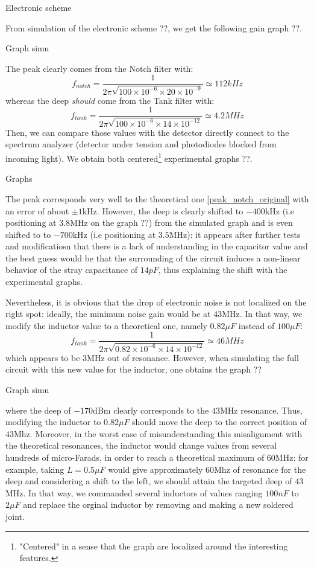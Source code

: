 \documentclass[12pt]{report}
\begin{document}
Electronic scheme

From simulation of the electronic scheme ??, we get the following gain graph ??. 

Graph simu

The peak clearly comes from the Notch filter with:
\begin{equation}
\label{peak_notch_original}
f_{notch} = \frac{1}{2\pi\sqrt{100 \times 10^{-6} \times 20 \times 10^{-9}}} \simeq 112kHz
\end{equation}
whereas the deep \textit{should} come from the Tank filter with:
\begin{equation}
f_{tank} = \frac{1}{2\pi\sqrt{100 \times 10^{-6} \times 14 \times 10^{-12}}} \simeq 4.2MHz
\end{equation}
Then, we can compare those values with the detector directly connect to the spectrum analyzer (detector under tension and photodiodes blocked from incoming light). We obtain both centered\footnote{"Centered" in a sense that the graph are localized around the interesting features.} experimental graphs ??.

Graphs 

The peak corresponds very well to the theoretical one \eqref{peak_notch_original} with an error of about $\pm1$kHz. However, the deep is clearly shifted to $-400$kHz (i.e positioning at $3.8$MHz on the graph ??) from the simulated graph and is even shifted to to $-700$kHz (i.e positioning at $3.5$MHz): it appears after further tests and modificatiosn that there is a lack of understanding in the capacitor value and the best guess would be that the surrounding of the circuit induces a non-linear behavior of the stray capacitance of $14pF$, thus explaining the shift with the experimental graphs.

Nevertheless, it is obvious that the drop of electronic noise is not localized on the right spot: ideally, the minimum noise gain would be at $43$MHz. In that way, we modify the inductor value to a theoretical one, namely $0.82\mu F$ instead of $100\mu F$:
\begin{equation}
f_{tank} = \frac{1}{2\pi\sqrt{0.82 \times 10^{-6} \times 14 \times 10^{-12}}} \simeq 46MHz
\end{equation}
which appears to be $3$MHz out of resonance. However, when simulating the full circuit with this new value for the inductor, one obtains the graph ??

Graph simu

where the deep of $-170$dBm clearly corresponds to the $43$MHz resonance. Thus, modifying the inductor to $0.82\mu F$ should move the deep to the correct position of $43$Mhz. Moreover, in the worst case of misunderstanding this misalignment with the theoretical resonances, the inductor would change values from several hundreds of micro-Farads, in order to reach a theoretical maximum of $60$MHz: for example, taking $L=0.5\mu F$ would give approximately $60$Mhz of resonance for the deep and considering a shift to the left, we should attain the targeted deep of $43$MHz. In that way, we commanded several inductors of values ranging $100nF$ to $2\mu F$ and replace the orginal inductor by removing and making a new soldered joint.
\end{document}
